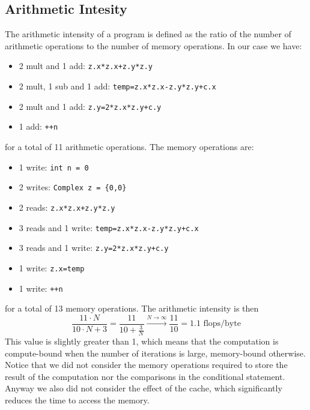 \subsection{Arithmetic Intesity}
    The arithmetic intensity of a program is defined as the ratio of the
    number of arithmetic operations to the number of memory operations.
    In our case we have:
    \begin{itemize}
        \item 2 mult and 1 add: \texttt{z.x*z.x+z.y*z.y}
        \item 2 mult, 1 sub and 1 add: \texttt{temp=z.x*z.x-z.y*z.y+c.x}
        \item 2 mult and 1 add: \texttt{z.y=2*z.x*z.y+c.y}
        \item 1 add: \texttt{++n}
    \end{itemize}
    for a total of 11 arithmetic operations. The memory operations are:
    \begin{itemize}
        \item 1 write: \texttt{int n = 0} 
        \item 2 writes: \texttt{Complex z = \{0,0\}}
        \item 2 reads: \texttt{z.x*z.x+z.y*z.y}
        \item 3 reads and 1 write: \texttt{temp=z.x*z.x-z.y*z.y+c.x}
        \item 3 reads and 1 write: \texttt{z.y=2*z.x*z.y+c.y}
        \item 1 write: \texttt{z.x=temp}
        \item 1 write: \texttt{++n}
    \end{itemize}
    for a total of 13 memory operations. The arithmetic intensity is then
    $$
        \frac{11 \cdot N}{ 10\cdot N + 3} 
        = \frac{11}{10+\frac{3}{N}} \xrightarrow{N \to \infty} \frac{11}{10}
        = 1.1 \text{ flops/byte}
    $$
    This value is slightly greater than 1, which means that the computation
    is compute-bound when the number of iterations is large, memory-bound
    otherwise. Notice that we did not consider the memory operations
    required to store the result of the computation nor the comparisons in
    the conditional statement. Anyway we also did not consider the effect
    of the cache, which significantly reduces the time to access the memory.


